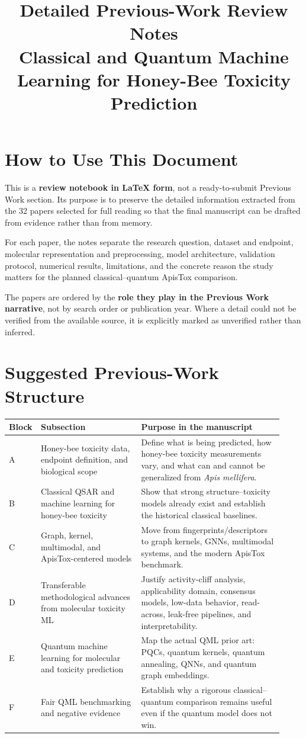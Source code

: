 \documentclass[11pt]{article}
\title{Detailed Previous-Work Review Notes\\
Classical and Quantum Machine Learning for Honey-Bee Toxicity Prediction}
\author{}
\date{}
\begin{document}
\maketitle
\tableofcontents
\newpage

\section{How to Use This Document}

This is a \textbf{review notebook in LaTeX form}, not a ready-to-submit Previous Work section. Its purpose is to preserve the detailed information extracted from the 32 papers selected for full reading so that the final manuscript can be drafted from evidence rather than from memory.

For each paper, the notes separate the research question, dataset and endpoint, molecular representation and preprocessing, model architecture, validation protocol, numerical results, limitations, and the concrete reason the study matters for the planned classical--quantum ApisTox comparison.

The papers are ordered by the \textbf{role they play in the Previous Work narrative}, not by search order or publication year. Where a detail could not be verified from the available source, it is explicitly marked as unverified rather than inferred.

\section{Suggested Previous-Work Structure}

\begin{longtable}{p{0.05\linewidth}p{0.36\linewidth}p{0.51\linewidth}}
\toprule
\textbf{Block} & \textbf{Subsection} & \textbf{Purpose in the manuscript} \\
\midrule
A & Honey-bee toxicity data, endpoint definition, and biological scope &
Define what is being predicted, how honey-bee toxicity measurements vary, and what can and cannot be generalized from \textit{Apis mellifera}.\\
B & Classical QSAR and machine learning for honey-bee toxicity &
Show that strong structure--toxicity models already exist and establish the historical classical baselines.\\
C & Graph, kernel, multimodal, and ApisTox-centered models &
Move from fingerprints/descriptors to graph kernels, GNNs, multimodal systems, and the modern ApisTox benchmark.\\
D & Transferable methodological advances from molecular toxicity ML &
Justify activity-cliff analysis, applicability domain, consensus models, low-data behavior, read-across, leak-free pipelines, and interpretability.\\
E & Quantum machine learning for molecular and toxicity prediction &
Map the actual QML prior art: PQCs, quantum kernels, quantum annealing, QNNs, and quantum graph embeddings.\\
F & Fair QML benchmarking and negative evidence &
Establish why a rigorous classical--quantum comparison remains useful even if the quantum model does not win.\\
\bottomrule
\end{longtable}
\end{document}
